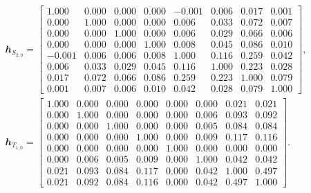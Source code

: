\begin{gather}
\mathbfit{h}_{S_{2,0}} =
\begin{bmatrix}
\num{1.000}  & \num{0.000} & \num{0.000} & \num{0.000} & \num{-0.001} & \num{0.006} & \num{0.017} & \num{0.001} \\
\num{0.000}  & \num{1.000} & \num{0.000} & \num{0.000} & \num{0.006}  & \num{0.033} & \num{0.072} & \num{0.007} \\
\num{0.000}  & \num{0.000} & \num{1.000} & \num{0.000} & \num{0.006}  & \num{0.029} & \num{0.066} & \num{0.006} \\
\num{0.000}  & \num{0.000} & \num{0.000} & \num{1.000} & \num{0.008}  & \num{0.045} & \num{0.086} & \num{0.010} \\
\num{-0.001} & \num{0.006} & \num{0.006} & \num{0.008} & \num{1.000}  & \num{0.116} & \num{0.259} & \num{0.042} \\
\num{0.006}  & \num{0.033} & \num{0.029} & \num{0.045} & \num{0.116}  & \num{1.000} & \num{0.223} & \num{0.028} \\
\num{0.017}  & \num{0.072} & \num{0.066} & \num{0.086} & \num{0.259}  & \num{0.223} & \num{1.000} & \num{0.079} \\
\num{0.001}  & \num{0.007} & \num{0.006} & \num{0.010} & \num{0.042}  & \num{0.028} & \num{0.079} & \num{1.000}
\end{bmatrix}
\label{eq:sym_partd_output_unc_cohermat_S_2_0_b}, \\
\mathbfit{h}_{T_{1,0}} =
\begin{bmatrix}
\num{1.000} & \num{0.000} & \num{0.000} & \num{0.000} & \num{0.000} & \num{0.000} & \num{0.021} & \num{0.021} \\
\num{0.000} & \num{1.000} & \num{0.000} & \num{0.000} & \num{0.000} & \num{0.006} & \num{0.093} & \num{0.092} \\
\num{0.000} & \num{0.000} & \num{1.000} & \num{0.000} & \num{0.000} & \num{0.005} & \num{0.084} & \num{0.084} \\
\num{0.000} & \num{0.000} & \num{0.000} & \num{1.000} & \num{0.000} & \num{0.009} & \num{0.117} & \num{0.116} \\
\num{0.000} & \num{0.000} & \num{0.000} & \num{0.000} & \num{1.000} & \num{0.000} & \num{0.000} & \num{0.000} \\
\num{0.000} & \num{0.006} & \num{0.005} & \num{0.009} & \num{0.000} & \num{1.000} & \num{0.042} & \num{0.042} \\
\num{0.021} & \num{0.093} & \num{0.084} & \num{0.117} & \num{0.000} & \num{0.042} & \num{1.000} & \num{0.497} \\
\num{0.021} & \num{0.092} & \num{0.084} & \num{0.116} & \num{0.000} & \num{0.042} & \num{0.497} & \num{1.000}
\end{bmatrix}
\label{eq:sym_partd_output_unc_cohermat_T_1_0_b}.
\end{gather}

